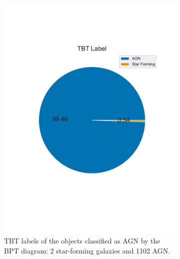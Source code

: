 \documentclass[letterpaper, oneside]{article}
\begin{document}
	\begin{figure}[H]
	\centering
	\begin{subfigure}[b]{0.4\textwidth}
		\centering
		\includegraphics[width=\textwidth]{../TBT_diagrams/tbt_label_pie.pdf}
		\caption{TBT labels of the objects classified as AGN by the BPT diagram: 2 star-forming galaxies and 1102 AGN.}
		\label{fig:T2_bpt_label_pie}
	\end{subfigure}
	\begin{subfigure}[b]{0.4\textwidth}
		\centering

\end{subfigure}
\end{figure}
\end{document}
